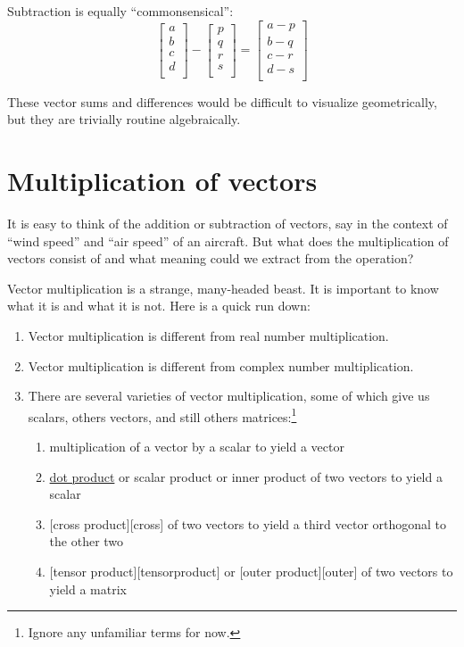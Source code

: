 \documentclass[
  a4paper,
]{article}
\providecommand{\tightlist}{%
  \setlength{\itemsep}{0pt}\setlength{\parskip}{0pt}}
\begin{document}
Subtraction is equally ``commonsensical'': \[
\begin{bmatrix}a\\b\\c\\d\\\end{bmatrix} - \begin{bmatrix}p\\q\\r\\s\\\end{bmatrix} = \begin{bmatrix}a-p\\b-q\\c-r\\d-s\\\end{bmatrix}
\]

These vector sums and differences would be difficult to visualize
geometrically, but they are trivially routine algebraically.

\hypertarget{multiplication-of-vectors}{%
\section{Multiplication of vectors}\label{multiplication-of-vectors}}

It is easy to think of the addition or subtraction of vectors, say in
the context of ``wind speed'' and ``air speed'' of an aircraft. But what
does the multiplication of vectors consist of and what meaning could we
extract from the operation?

Vector multiplication is a strange, many-headed beast. It is important
to know what it is and what it is not. Here is a quick run down:

\begin{enumerate}
\def\labelenumi{\arabic{enumi}.}
\item
  Vector multiplication is different from real number multiplication.
\item
  Vector multiplication is different from complex number multiplication.
\item
  There are several varieties of vector multiplication, some of which
  give us scalars, others vectors, and still others matrices:\footnote{Ignore
    any unfamiliar terms for now.}

  \begin{enumerate}
  \def\labelenumii{(\alph{enumii})}
  \tightlist
  \item
    multiplication of a vector by a scalar to yield a vector
  \item
    \href{http://mathworld.wolfram.com/DotProduct.html}{dot product} or
    scalar product or inner product of two vectors to yield a scalar
  \item
    {[}cross product{]}{[}cross{]} of two vectors to yield a third
    vector orthogonal to the other two
  \item
    {[}tensor product{]}{[}tensorproduct{]} or {[}outer
    product{]}{[}outer{]} of two vectors to yield a matrix
  \end{enumerate}
\end{enumerate}
\end{document}
